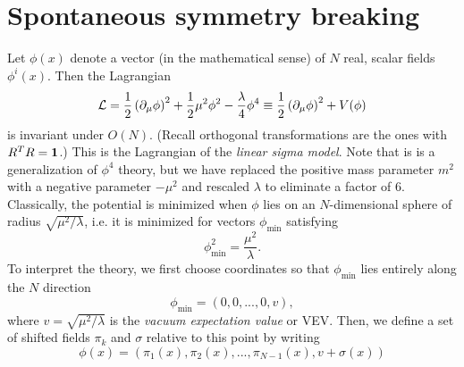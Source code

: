 
\section{Spontaneous symmetry breaking}\label{sec:ssb}
Let $\phi(x)$ denote a vector (in the mathematical sense) of $N$ real,
scalar fields $\phi^i(x)$. Then the Lagrangian
\begin{equation}
  \mathcal{L}=\frac{1}{2}\left(\partial_\mu\phi\right)^2
        +\frac{1}{2}\mu^2\phi^2-\frac{\lambda}{4}\phi^4
       \equiv\frac{1}{2}\left(\partial_\mu\phi\right)^2
        +V(\phi)
\end{equation}
is invariant under $O(N)$. (Recall orthogonal transformations are the
ones with $R^TR={\mathbf 1}$.) This is the Lagrangian of the {\it linear
sigma model}. Note that is is a generalization of $\phi^4$ theory,
but we have replaced the positive mass parameter $m^2$ with a
negative parameter $-\mu^2$ and rescaled $\lambda$ to eliminate a factor of 6.
Classically, the potential is minimized when $\phi$ lies
on an $N$-dimensional sphere of radius $\sqrt{\mu^2/\lambda}$, i.e. 
it is minimized for vectors $\phi_\text{min}$ satisfying
\begin{equation}
  \phi_\text{min}^2=\frac{\mu^2}{\lambda}.
\end{equation}
To interpret the theory, we first choose coordinates so that 
$\phi_\text{min}$ lies
entirely along the $N$ direction
\begin{equation}\label{eq:phidir}
  \phi_\text{min}=(0,0,...,0,v),
\end{equation}
where $v=\sqrt{\mu^2/\lambda}$ is the {\it vacuum expectation value} or VEV.
Then, we define a set of shifted fields $\pi_k$ and $\sigma$ relative
to this point by writing
\begin{equation}\label{eq:phishift}
  \phi(x)=\left(\pi_1(x),\pi_2(x),...,\pi_{N-1}(x),v+\sigma(x)\right)
\end{equation}
